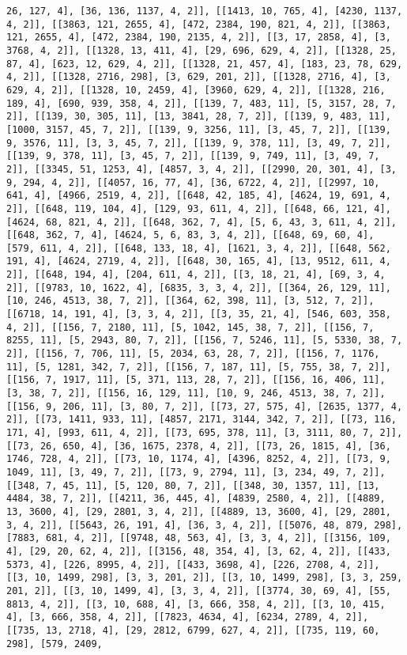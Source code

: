 \documentclass[12pt,fleqn]{article}\usepackage{../../common}
\begin{document}
\begin{verbatim}
26, 127, 4], [36, 136, 1137, 4, 2]], [[1413, 10, 765, 4], [4230, 1137, 4, 2]], [[3863, 121, 2655, 4], [472, 2384, 190, 821, 4, 2]], [[3863, 121, 2655, 4], [472, 2384, 190, 2135, 4, 2]], [[3, 17, 2858, 4], [3, 3768, 4, 2]], [[1328, 13, 411, 4], [29, 696, 629, 4, 2]], [[1328, 25, 87, 4], [623, 12, 629, 4, 2]], [[1328, 21, 457, 4], [183, 23, 78, 629, 4, 2]], [[1328, 2716, 298], [3, 629, 201, 2]], [[1328, 2716, 4], [3, 629, 4, 2]], [[1328, 10, 2459, 4], [3960, 629, 4, 2]], [[1328, 216, 189, 4], [690, 939, 358, 4, 2]], [[139, 7, 483, 11], [5, 3157, 28, 7, 2]], [[139, 30, 305, 11], [13, 3841, 28, 7, 2]], [[139, 9, 483, 11], [1000, 3157, 45, 7, 2]], [[139, 9, 3256, 11], [3, 45, 7, 2]], [[139, 9, 3576, 11], [3, 3, 45, 7, 2]], [[139, 9, 378, 11], [3, 49, 7, 2]], [[139, 9, 378, 11], [3, 45, 7, 2]], [[139, 9, 749, 11], [3, 49, 7, 2]], [[3345, 51, 1253, 4], [4857, 3, 4, 2]], [[2990, 20, 301, 4], [3, 9, 294, 4, 2]], [[4057, 16, 77, 4], [36, 6722, 4, 2]], [[2997, 10, 641, 4], [4966, 2519, 4, 2]], [[648, 42, 185, 4], [4624, 19, 691, 4, 2]], [[648, 119, 104, 4], [129, 93, 611, 4, 2]], [[648, 66, 121, 4], [4624, 68, 821, 4, 2]], [[648, 362, 7, 4], [5, 6, 43, 3, 611, 4, 2]], [[648, 362, 7, 4], [4624, 5, 6, 83, 3, 4, 2]], [[648, 69, 60, 4], [579, 611, 4, 2]], [[648, 133, 18, 4], [1621, 3, 4, 2]], [[648, 562, 191, 4], [4624, 2719, 4, 2]], [[648, 30, 165, 4], [13, 9512, 611, 4, 2]], [[648, 194, 4], [204, 611, 4, 2]], [[3, 18, 21, 4], [69, 3, 4, 2]], [[9783, 10, 1622, 4], [6835, 3, 3, 4, 2]], [[364, 26, 129, 11], [10, 246, 4513, 38, 7, 2]], [[364, 62, 398, 11], [3, 512, 7, 2]], [[6718, 14, 191, 4], [3, 3, 4, 2]], [[3, 35, 21, 4], [546, 603, 358, 4, 2]], [[156, 7, 2180, 11], [5, 1042, 145, 38, 7, 2]], [[156, 7, 8255, 11], [5, 2943, 80, 7, 2]], [[156, 7, 5246, 11], [5, 5330, 38, 7, 2]], [[156, 7, 706, 11], [5, 2034, 63, 28, 7, 2]], [[156, 7, 1176, 11], [5, 1281, 342, 7, 2]], [[156, 7, 187, 11], [5, 755, 38, 7, 2]], [[156, 7, 1917, 11], [5, 371, 113, 28, 7, 2]], [[156, 16, 406, 11], [3, 38, 7, 2]], [[156, 16, 129, 11], [10, 9, 246, 4513, 38, 7, 2]], [[156, 9, 206, 11], [3, 80, 7, 2]], [[73, 27, 575, 4], [2635, 1377, 4, 2]], [[73, 1411, 933, 11], [4857, 2171, 3144, 342, 7, 2]], [[73, 116, 171, 4], [993, 611, 4, 2]], [[73, 695, 378, 11], [3, 3111, 80, 7, 2]], [[73, 26, 650, 4], [36, 1675, 2378, 4, 2]], [[73, 26, 1815, 4], [36, 1746, 728, 4, 2]], [[73, 10, 1174, 4], [4396, 8252, 4, 2]], [[73, 9, 1049, 11], [3, 49, 7, 2]], [[73, 9, 2794, 11], [3, 234, 49, 7, 2]], [[348, 7, 45, 11], [5, 120, 80, 7, 2]], [[348, 30, 1357, 11], [13, 4484, 38, 7, 2]], [[4211, 36, 445, 4], [4839, 2580, 4, 2]], [[4889, 13, 3600, 4], [29, 2801, 3, 4, 2]], [[4889, 13, 3600, 4], [29, 2801, 3, 4, 2]], [[5643, 26, 191, 4], [36, 3, 4, 2]], [[5076, 48, 879, 298], [7883, 681, 4, 2]], [[9748, 48, 563, 4], [3, 3, 4, 2]], [[3156, 109, 4], [29, 20, 62, 4, 2]], [[3156, 48, 354, 4], [3, 62, 4, 2]], [[433, 5373, 4], [226, 8995, 4, 2]], [[433, 3698, 4], [226, 2708, 4, 2]], [[3, 10, 1499, 298], [3, 3, 201, 2]], [[3, 10, 1499, 298], [3, 3, 259, 201, 2]], [[3, 10, 1499, 4], [3, 3, 4, 2]], [[3774, 30, 69, 4], [55, 8813, 4, 2]], [[3, 10, 688, 4], [3, 666, 358, 4, 2]], [[3, 10, 415, 4], [3, 666, 358, 4, 2]], [[7823, 4634, 4], [6234, 2789, 4, 2]], [[735, 13, 2718, 4], [29, 2812, 6799, 627, 4, 2]], [[735, 119, 60, 298], [579, 2409, 
\end{verbatim}
\end{document}
